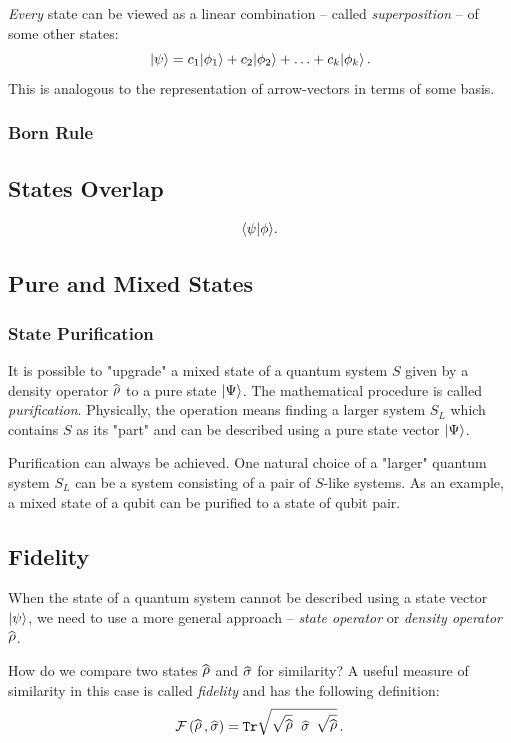 \emph{Every} state can be viewed as a linear combination -- called \emph{superposition} -- of some other states:
\[
|{\psi}\rangle = c_1|{\phi_1}\rangle+c_2|{\phi_2}\rangle+\ldots+c_k|{\phi_k}\rangle\,.
\]
This is analogous to the representation of arrow-vectors in terms of some basis. 

\subsubsection*{Born Rule}


\subsection{States Overlap}
\[
\langle{\psi}|{\phi\rangle}.
\]

\subsection{Pure and Mixed States}

\subsubsection{State Purification}
It is possible to "upgrade" a mixed state of a quantum system $S$ given by a density operator $\op{\rho}$ to a pure state $|{\Psi}\rangle$. The mathematical procedure is called \emph{purification}. Physically, the operation means finding a larger system $S_L$ which contains $S$ as its "part" and can be described using a pure state vector $|{\Psi}\rangle$.

Purification can always be achieved. One natural choice of a "larger" quantum system $S_L$ can be a system consisting of a pair of $S$-like systems. As an example, a mixed state of a qubit can be purified to a state of qubit pair.


\subsection{Fidelity}
When the state of a quantum system cannot be described using a state vector $|{\psi}\rangle$, we need to use a more general approach -- \emph{state operator} or \emph{density operator} $\op{\rho}$.

How do we compare two states $\op{\rho}$ and $\op{\sigma}$ for similarity? A useful measure of similarity in this case is called \emph{fidelity} and has the following definition:
\[
\mathcal{F}\,(\op{\rho}\,,\op{\sigma}) = \mathtt{Tr}\sqrt{\sqrt{\op{\rho}}\,\,\op{\sigma}\,\sqrt{\op{\rho}}}\,.
\]

